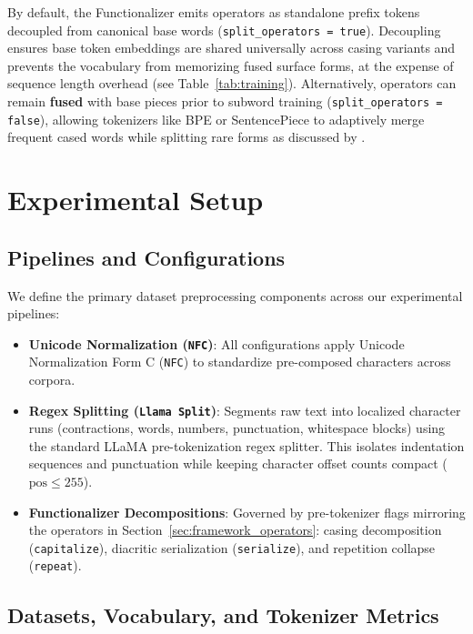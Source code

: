 \documentclass{article}
\begin{document}
By default, the Functionalizer emits operators as standalone prefix tokens decoupled from canonical base words (\texttt{split\_operators = true}). Decoupling ensures base token embeddings are shared universally across casing variants and prevents the vocabulary from memorizing fused surface forms, at the expense of sequence length overhead (see Table~\ref{tab:training}). Alternatively, operators can remain \textbf{fused} with base pieces prior to subword training (\texttt{split\_operators = false}), allowing tokenizers like BPE or SentencePiece to adaptively merge frequent cased words while splitting rare forms as discussed by \citet{jain2023}.

\section{Experimental Setup}
\label{sec:experimental_setup}

\subsection{Pipelines and Configurations}\label{sec:pipelines}

We define the primary dataset preprocessing components across our experimental pipelines:
\begin{itemize}
    \item \textbf{Unicode Normalization (\texttt{NFC})}: All configurations apply Unicode Normalization Form C (\texttt{NFC}) to standardize pre-composed characters across corpora.
    \item \textbf{Regex Splitting (\texttt{Llama Split})}: Segments raw text into localized character runs (contractions, words, numbers, punctuation, whitespace blocks) using the standard LLaMA pre-tokenization regex splitter. This isolates indentation sequences and punctuation while keeping character offset counts compact ($\text{pos} \le 255$).
    \item \textbf{Functionalizer Decompositions}: Governed by pre-tokenizer flags mirroring the operators in Section~\ref{sec:framework_operators}: casing decomposition (\texttt{capitalize}), diacritic serialization (\texttt{serialize}), and repetition collapse (\texttt{repeat}).
\end{itemize}

\subsection{Datasets, Vocabulary, and Tokenizer Metrics}\label{sec:datasets}
\end{document}
